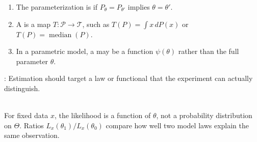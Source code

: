 \begin{definition} \label{def:identifiability-and-parametric-functionals} 
\begin{enumerate}[label=(\roman*)]
\setlength{\itemsep}{0pt}
\item The parameterization is  if $P_\theta=P_{\theta'}$ implies $\theta=\theta'$.
\item A  is a map $T:\mathcal{P}\to\mathcal{T}$, such as $T(P)=\int x\,dP(x)$ or $T(P)=\operatorname{median}(P)$.
\item In a parametric model, a  may be a function $\psi(\theta)$ rather than the full parameter $\theta$.
\end{enumerate}
: Estimation should target a law or functional that the experiment can actually distinguish.
\end{definition}

\begin{remark} \label{rem:likelihood-is-relative-evidence} \\
For fixed data $x$, the likelihood is a function of $\theta$, not a probability distribution on $\Theta$.  Ratios $L_x(\theta_1)/L_x(\theta_0)$ compare how well two model laws explain the same observation.
\end{remark}
